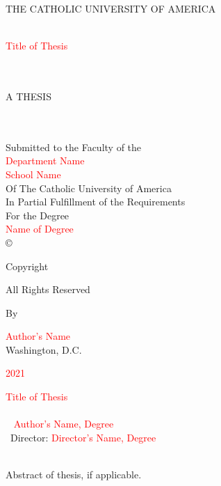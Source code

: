 \documentclass[12pt]{report}
\begin{document}
	
\thispagestyle{empty}
\center
THE CATHOLIC UNIVERSITY OF AMERICA \\ \ 

\begin{singlespace}
	\textcolor{red}{Title of Thesis} \\ \ \\ \ 
\end{singlespace}
\doublespace

  A THESIS \\ \ \\ \ 

  Submitted to the Faculty of the\\
  \textcolor{red}{Department Name}\\
  \textcolor{red}{School Name}\\
  Of The Catholic University of America\\
  In Partial Fulfillment of the Requirements\\
  For the Degree\\
  \textcolor{red}{Name of Degree}\\

  \copyright

  Copyright

  All Rights Reserved

  By

  \textcolor{red}{Author's Name}\\  
  	 
  Washington, D.C. \\

\vfill

	 \textcolor{red}{2021}


\newpage 
\thispagestyle{empty}
\singlespace 
\textcolor{red}{Title of Thesis} \\ \ \\ \
\doublespace
\textcolor{red}{Author's Name, Degree} \\ \ 
Director: \textcolor{red}{Director's Name, Degree}\\ \ 
\doublespace
\begin{justify}
Abstract of thesis, if applicable. \blindtext[4]
\end{justify}
\thispagestyle{empty}
\clearpage
\end{document}

